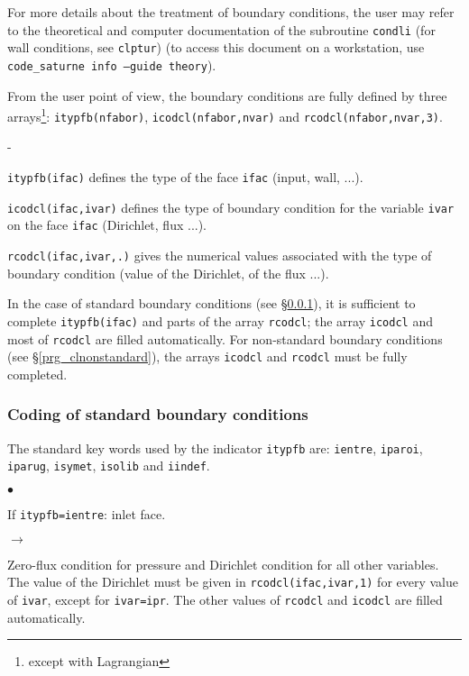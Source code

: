 {{{For more details about the treatment of boundary conditions, the user
may refer to the theoretical and computer documentation \cite{theory} of
the subroutine \texttt{condli} (for wall conditions, see
\texttt{clptur}) (to access this document on a workstation, use
\mbox{\texttt{code\_saturne~info --guide theory}}).

From the user point of view, the boundary conditions are fully
defined by three arrays\footnote{except with Lagrangian}:
\texttt{itypfb(nfabor)},
\texttt{icodcl(nfabor,nvar)} and
\texttt{rcodcl(nfabor,nvar,3)}.
\begin{list}{-}{}
\item \texttt{itypfb(ifac)} defines the type of the face \texttt{ifac}
      (input, wall, ...).
\item \texttt{icodcl(ifac,ivar)} defines the type of boundary
      condition for the variable \texttt{ivar} on the face \texttt{ifac}
      (Dirichlet, flux ...).
\item \texttt{rcodcl(ifac,ivar,.)} gives the numerical values associated with the
      type of boundary condition (value of the Dirichlet, of the flux ...).
\end{list}

In the case of standard boundary conditions (see
\S\ref{prg_clstandard}), it is sufficient to complete \texttt{itypfb(ifac)} and
parts of the array \texttt{rcodcl}; the array \texttt{icodcl} and most of \texttt{rcodcl} are filled automatically. For non-standard boundary
conditions (see \S\ref{prg_clnonstandard}), the arrays \texttt{icodcl} and
\texttt{rcodcl} must be fully completed.

\subsubsection{Coding of standard boundary conditions}
\label{prg_clstandard}%
The standard key words used by the indicator \texttt{itypfb} are:
\texttt{ientre}, \texttt{iparoi},
\texttt{iparug}, \texttt{isymet},
\texttt{isolib} and \texttt{iindef}.

\begin{list}{$\bullet$}{}
\item If \texttt{itypfb=ientre}: inlet face.

\begin{list}{$\rightarrow$}{}
\item Zero-flux condition for pressure and Dirichlet condition for all
      other variables. The value of the Dirichlet must be given in
      \texttt{rcodcl(ifac,ivar,1)} for every value of \texttt{ivar}, except for
      \texttt{ivar=ipr}. The other values of \texttt{rcodcl} and
      \texttt{icodcl} are filled automatically.
\end{list}


\end{list}}}}
